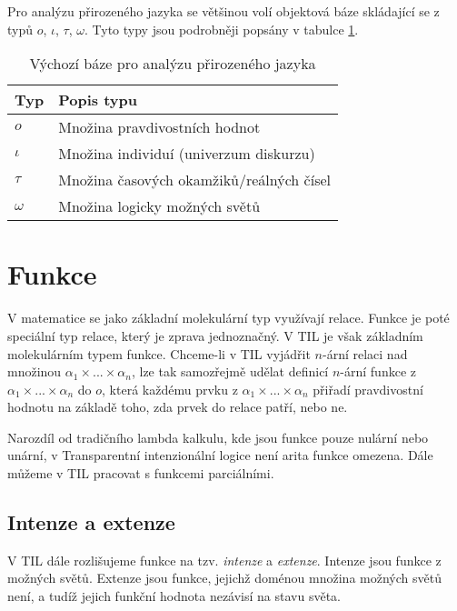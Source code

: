 Pro analýzu přirozeného jazyka se většinou volí objektová báze skládající se z typů {$o$, $\iota$,
$\tau$, $\omega$}. Tyto typy jsou podrobněji popsány v tabulce \ref{tab:default-base}.

\begin{table}
    \caption{Výchozí báze pro analýzu přirozeného jazyka}
    \label{tab:default-base}
    \centering

    \begin{tabular} { | l l | }
        \hline
        Typ      & Popis typu \\
        \hline
        $o$      & Množina pravdivostních hodnot \\
        $\iota$  & Množina individuí (univerzum diskurzu) \\
        $\tau$   & Množina časových okamžiků/reálných čísel \\
        $\omega$ & Množina logicky možných světů \\
        \hline
    \end{tabular}
\end{table}

\section{Funkce}

V matematice se jako základní molekulární typ využívají relace. Funkce je poté speciální typ relace,
který je zprava jednoznačný. V TIL je však základním molekulárním typem funkce. Chceme-li v TIL
vyjádřit $n$-ární relaci nad množinou $\alpha_1 \times ... \times \alpha_n$, lze tak samozřejmě
udělat definicí $n$-ární funkce z $\alpha_1 \times ... \times \alpha_n$ do $o$, která každému prvku
z $\alpha_1 \times ... \times \alpha_n$ přiřadí pravdivostní hodnotu na základě toho, zda prvek
do relace patří, nebo ne.

Narozdíl od tradičního lambda kalkulu, kde jsou funkce pouze nulární nebo unární, v Transparentní
intenzionální logice není arita funkce omezena. Dále můžeme v TIL pracovat s funkcemi parciálními.

\subsection{Intenze a extenze}

V TIL dále rozlišujeme funkce na tzv. \textit{intenze} a \textit{extenze}. Intenze jsou funkce
z možných světů. Extenze jsou funkce, jejichž doménou množina možných světů není, a tudíž jejich
funkční hodnota nezávisí na stavu světa.

